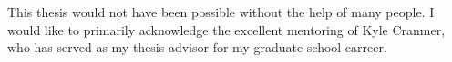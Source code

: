 %

This thesis would not have been possible without the help of many people.
I would like to primarily acknowledge the excellent mentoring of Kyle Cranmer, who has served as my thesis advisor for my graduate school carreer.
